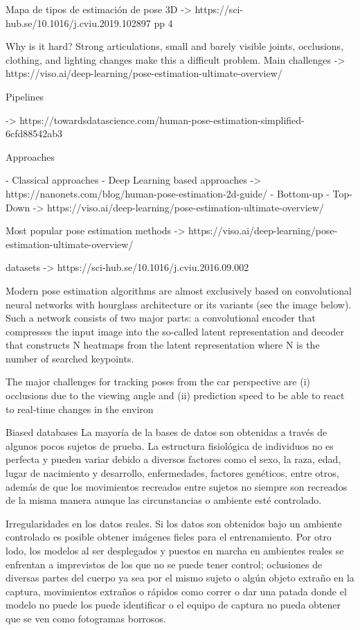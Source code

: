 Mapa de tipos de estimación de pose 3D
-> https://sci-hub.se/10.1016/j.cviu.2019.102897 pp 4

Why is it hard?
Strong articulations, small and barely visible joints, occlusions, clothing, and lighting changes make this a difficult problem.
Main challenges -> https://viso.ai/deep-learning/pose-estimation-ultimate-overview/

Pipelines

-> https://towardsdatascience.com/human-pose-estimation-simplified-6cfd88542ab3

Approaches

- Classical approaches
- Deep Learning based approaches
-> https://nanonets.com/blog/human-pose-estimation-2d-guide/
- Bottom-up
- Top-Down
-> https://viso.ai/deep-learning/pose-estimation-ultimate-overview/


Most popular pose estimation methods
-> https://viso.ai/deep-learning/pose-estimation-ultimate-overview/


datasets
-> https://sci-hub.se/10.1016/j.cviu.2016.09.002

Modern pose estimation algorithms are almost exclusively based on convolutional neural networks with hourglass architecture or its variants (see the image below). Such a network consists of two major parts: a convolutional encoder that compresses the input image into the so-called latent representation and decoder that constructs N heatmaps from the latent representation where N is the number of searched keypoints.

The major challenges for tracking poses from the car perspective are
(i) occlusions due to the viewing angle and (ii) prediction
speed to be able to react to real-time changes in the environ

Biased databases
La mayoría de la bases de datos son obtenidas a través de algunos pocos sujetos de prueba.
La estructura fisiológica de individuos no es perfecta y pueden variar debido a diversos factores
como el sexo, la raza, edad, lugar de nacimiento y desarrollo, enfermedades, factores genéticos, entre
otros, además de que los movimientos recreados entre sujetos no siempre son recreados de la misma manera
aunque las circunstancias o ambiente esté controlado.

Irregularidades en los datos reales.
Si los datos son obtenidos bajo un ambiente controlado es posible obtener imágenes fieles para el
entrenamiento. Por otro lodo, los modelos al ser desplegados y puestos en marcha en ambientes reales
se enfrentan a imprevistos de los que no se puede tener control; oclusiones de diversas partes del
cuerpo ya sea por el mismo sujeto o algún objeto extraño en la captura, movimientos extraños o rápidos
como correr o dar una patada donde el modelo no puede los puede identificar o el equipo de captura
no pueda obtener que se ven como fotogramas borrosos.


